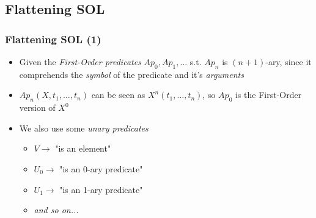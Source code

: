 \documentclass{beamer}
\begin{document}
            \subsection{Flattening SOL}
                \begin{frame}
                    \frametitle{Flattening SOL (1)}
                    \begin{itemize}
                        \item Given the \textit{First-Order predicates} $ Ap_0, Ap_1, \dots $ s.t. $ Ap_n $ is $ (n + 1) $-ary, since it comprehends the \textit{symbol} of the predicate and it's \textit{arguments}
                        \item $ Ap_n(X, t_1, \dots, t_n) $ can be seen as $ X^n(t_1, \dots, t_n) $, so $ Ap_0 $ is the First-Order version of $ X^0 $
                        \item We also use some \textit{unary predicates}
                              \begin{itemize}
                                \item $ V \rightarrow $ "is an element"
                                \item $ U_0 \rightarrow $ "is an 0-ary predicate"
                                \item $ U_1 \rightarrow $ "is an 1-ary predicate"
                                \item \textit{and so on...}
                              \end{itemize}
                    \end{itemize}
                \end{frame}
\end{document}
